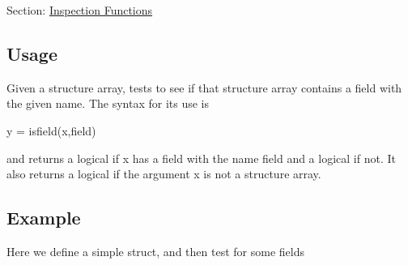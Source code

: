 Section\-: \hyperlink{sec_inspection}{Inspection Functions} \hypertarget{vtkwidgets_vtkxyplotwidget_Usage}{}\subsection{Usage}\label{vtkwidgets_vtkxyplotwidget_Usage}
Given a structure array, tests to see if that structure array contains a field with the given name. The syntax for its use is \begin{DoxyVerb}  y = isfield(x,field)
\end{DoxyVerb}
 and returns a logical {} if {\ttfamily x} has a field with the name {\ttfamily field} and a logical {} if not. It also returns a logical {} if the argument {\ttfamily x} is not a structure array. \hypertarget{variables_struct_Example}{}\subsection{Example}\label{variables_struct_Example}
Here we define a simple struct, and then test for some fields


